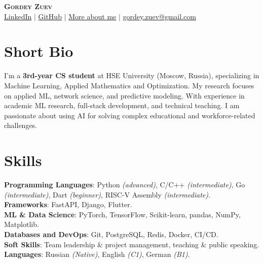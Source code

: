 \documentclass[letterpaper,11pt]{article}
\begin{document}
\begin{center}
    \textsc{\Huge{\textbf{Gordey Zuev}}} \\ \vspace{1pt}
    \href{{https://www.linkedin.com/in/gordey-zuev/}}{\textcolor{blue!50!black}{LinkedIn}} $|$
    \href{https://github.com/GordeyZuev}{\textcolor{blue!50!black}{GitHub}} $|$
    \href{http://gordeyzuev.notion.site}{\textcolor{blue!50!black}{More about me}} $|$
    \href{mailto:gordey.zuev@gmail.com}{\textcolor{blue!50!black}{gordey.zuev@gmail.com}}
\end{center}


\section{Short Bio}
 \begin{itemize}[leftmargin=0.15in, label={}]
    \small{\item{
     {I’m a \textbf{3rd-year CS student} at HSE University (Moscow, Russia), specializing in Machine Learning, Applied Mathematics and Optimization. My research focuses on applied ML, network science, and predictive modeling. With experience in academic ML research, full-stack development, and technical teaching. I am passionate about using AI for solving complex educational and workforce-related challenges.}
    }}
 \end{itemize}


\section{Skills}
 \begin{itemize}[leftmargin=0.15in, label={}]
    \small{\item{
     \textbf{Programming Languages}{: Python \textit{(advanced)}, C/C++ \textit{(intermediate)}, Go \textit{(intermediate)}, Dart \textit{(beginner)}, RISC-V Assembly \textit{(intermediate)}.} \\
     \textbf{Frameworks}{: FastAPI, Django, Flutter.} \\
     \textbf{ML \& Data Science}{: PyTorch, TensorFlow, Scikit-learn, pandas, NumPy, Matplotlib.} \\
     \textbf{Databases and DevOps}{: Git, PostgreSQL, Redis, Docker, CI/CD.} \\
     \textbf{Soft Skills}{: Team leadership \& project management, teaching \& public speaking.} \\
     \textbf{Languages}{: Russian \textit{(Native)}, English \textit{(C1)}, German \textit{(B1)}.}
    }}
 \end{itemize}
\end{document}
